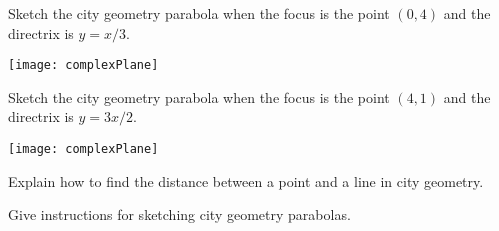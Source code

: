 \documentclass[nooutcomes]{ximera}
\begin{document}
\break

\begin{problem}
Sketch the city geometry parabola when the focus is the point $(0,4)$
and the directrix is $y=x/3$.
\begin{image}
\texttt{[image: complexPlane]}
\end{image}
\end{problem}

\break

\begin{problem}
Sketch the city geometry parabola when the focus is the point $(4,1)$
and the directrix is $y=3x/2$.
\begin{image}
\texttt{[image: complexPlane]}
\end{image}
\end{problem}

\begin{problem}
Explain how to find the distance between a point and a line in city
geometry.
\end{problem}


\begin{problem}
Give instructions for sketching city geometry parabolas.
\end{problem}
\end{document}
